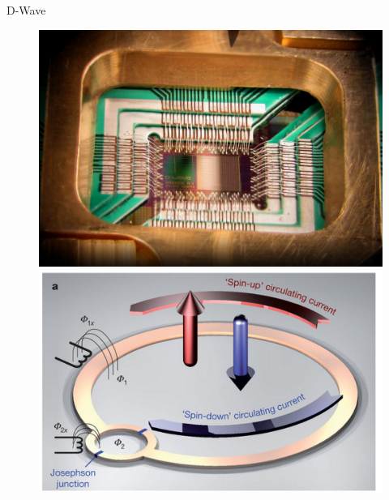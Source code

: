 \documentclass{beamer}
\begin{document}
\begin{frame}{D-Wave}

\begin{figure}[ht]
\tiny
\centering
    \begin{minipage}{.2\linewidth}
      \includegraphics[scale=.15]{pasted13}
    \end{minipage}%
    \qquad\qquad\qquad\qquad\qquad\qquad
    \begin{minipage}{.5\linewidth}
      \includegraphics[scale=.25]{pasted15}
    \end{minipage}%
\end{figure}


\end{frame}
\end{document}

